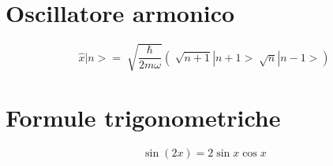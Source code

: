 \section{Oscillatore armonico}
\begin{equation*}
    \hat{x}|n> = \sqrt[]{\frac{\hslash}{2m\omega}} (\sqrt[]{n+1}|n+1> \sqrt[]{n}|n-1>)
\end{equation*}

\section{Formule trigonometriche}

\begin{equation*}
    \sin (2x) = 2 \sin x \cos x
\end{equation*}
